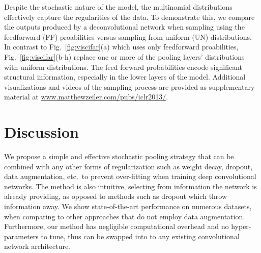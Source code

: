 \documentclass{article} \usepackage{nips12submit_e,times}
\newcommand{\fig}[1]{Fig.~\ref{fig:#1}}
\begin{document}
Despite the stochastic nature of the model, the multinomial distributions
effectively capture the regularities of the data. To demonstrate this, we compare the outputs
produced by a deconvolutional network when sampling using the feedforward (FF) proabilities versus
sampling from uniform (UN) distributions.
In contrast to \fig{viscifar}(a) which uses only feedforward proabilities, \fig{viscifar}(b-h)
replace one or more of the pooling layers' distributions with uniform distributions.
The feed forward
probabilities encode significant structural information, especially in
the lower layers of the model.  Additional visualizations and videos of
the sampling process are provided as supplementary material at
\url{www.matthewzeiler.com/pubs/iclr2013/}.





\vspace{-4mm}
\section{Discussion}
\vspace{-3mm}
We propose a simple and effective stochastic pooling
strategy that can be combined with any other forms of regularization
such as weight decay, dropout, data augmentation, etc.~to prevent
over-fitting when training deep convolutional networks. The method is
also intuitive, selecting from information the network is already
providing, as opposed to methods such as dropout which throw
information away. We show state-of-the-art performance on numerous
datasets, when comparing to other approaches that do not employ data
augmentation. Furthermore, our method has negligible computational
overhead and no hyper-parameters to tune, thus can be swapped into to
any existing convolutional network architecture.


\baselineskip=1pt


\end{document}
